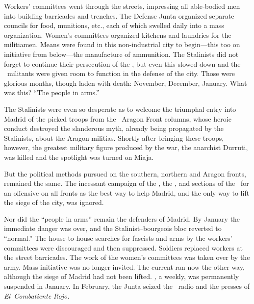 Workers’ committees went through the streets, impressing all able-bodied men into building barricades and trenches. The Defense Junta organized separate councils for food, munitions, etc., each of which swelled daily into a mass organization. Women’s committees organized kitchens and laundries for the militiamen. Means were found in this non-industrial city to begin—this too on initiative from below—the manufacture of ammunition. The Stalinists did not forget to continue their persecution of the \POUM, but even this slowed down and the \POUM\ militants were given room to function in the defense of the city. Those were glorious months, though laden with death: November, December, January. What was this? ``The people in arms.''

\indexCNT{}
The Stalinists were even so desperate as to welcome the triumphal entry into Madrid of the picked troops from the \CNT\ Aragon Front columns, whose heroic conduct destroyed the slanderous myth, already being propagated by the Stalinists, about the Aragon militias. Shortly after bringing these troops, however, the greatest military figure produced by the war, the anarchist Durruti, was killed and the spotlight was turned on Miaja.

But the political methods pursued on the southern, northern and Aragon fronts, remained the same. The incessant campaign of the \CNT, the \POUM, and sections of the \UGT\ for an offensive on all fronts as the best way to help Madrid, and the only way to lift the siege of the city, was ignored.

Nor did the ``people in arms'' remain the defenders of Madrid. By January the immediate danger was over, and the Stalinist--bourgeois bloc reverted to ``normal.'' The house-to-house searches for fascists and arms by the workers’ committees were discouraged and then suppressed. Soldiers replaced workers at the street barricades. The work of the women’s committees was taken over by the army. Mass initiative was no longer invited. The current ran now the other way, although the siege of Madrid had not been lifted. \emph{\POUM,} a weekly, was permanently suspended in January. In February, the Junta seized the \POUM\ radio and the presses of \emph{El~Combatiente Rojo.}

